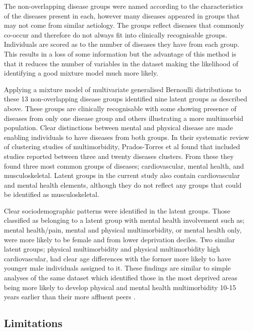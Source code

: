 \documentclass[12pt,]{report}
\begin{document}
The non-overlapping disease groups were named according to the
characteristics of the diseases present in each, however many diseases
appeared in groups that may not come from similar aetiology. The groups
reflect diseases that commonly co-occur and therefore do not always fit
into clinically recognisable groups. Individuals are scored as to the
number of diseases they have from each group. This results in a loss of
some information but the advantage of this method is that it reduces the
number of variables in the dataset making the likelihood of identifying
a good mixture model much more likely.

Applying a mixture model of multivariate generalised Bernoulli
distributions to these 13 non-overlapping disease groups identified nine
latent groups as described above. These groups are clinically
recognisable with some showing presence of diseases from only one
disease group and others illustrating a more multimorbid population.
Clear distinctions between mental and physical disease are made enabling
individuals to have diseases from both groups. In their systematic
review of clustering studies of multimorbidity, Prados-Torres et al
\citeyearpar{RN98} found that included studies reported between three
and twenty diseases clusters. From these they found three most common
groups of diseases; cardiovascular, mental health, and musculoskeletal.
Latent groups in the current study also contain cardiovascular and
mental health elements, although they do not reflect any groups that
could be identified as musculoskeletal.

Clear sociodemographic patterns were identified in the latent groups.
Those classified as belonging to a latent group with mental health
involvement such as; mental health/pain, mental and physical
multimorbidity, or mental health only, were more likely to be female and
from lower deprivation deciles. Two similar latent groups; physical
multimorbidity and physical multimorbidity high cardiovascular, had
clear age differences with the former more likely to have younger male
individuals assigned to it. These findings are similar to simple
analyses of the same dataset which identified those in the most deprived
areas being more likely to develop physical and mental health
multimorbidity 10-15 years earlier than their more affluent peers
\citep{RN33}.

\subsection{Limitations}\label{subsec:clust-limitations}
\end{document}
